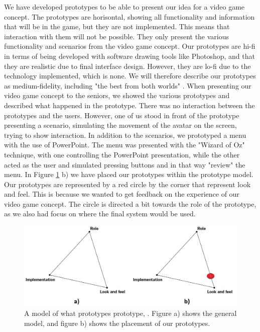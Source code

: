 We have developed prototypes to be able to present our idea for a video game concept. The prototypes are horisontal, showing all functionality and information that will be in the game, but they are not implemented. This means that interaction with them will not be possible. They only present the various functionality and scenarios from the video game concept. Our prototypes are hi-fi in terms of being developed with software drawing tools like Photoshop, and that they are realistic due to final interface design. However, they are lo-fi due to the technology implemented, which is none. We will therefore describe our prototypes as medium-fidelity, including "the best from both worlds" \cite{mediumfidelity}. When presenting our video game concept to the seniors, we showed the various prototypes and described what happened in the prototype. There was no interaction between the prototypes and the users. However, one of us stood in front of the prototype presenting a scenario, simulating the movement of the avatar on the screen, trying to show interaction. In addition to the scenarios, we prototyped a menu with the use of PowerPoint. The menu was presented with the "Wizard of Oz" technique, with one controlling the PowerPoint presentation, while the other acted as the user and simulated pressing buttons and in that way "review" the menu. In Figure \ref{fig:prototype} b) we have placed our prototypes within the prototype model. Our prototypes are represented by a red circle by the corner that represent look and feel. This is because we wanted to get feedback on the experience of our video game concept. The circle is directed a bit towards the role of the prototype, as we also had focus on where the final system would be used. 

\begin{figure} [H]
\centering
\includegraphics[scale=0.4]{prototypemodelDobbel.jpg}
\caption[Prototype model]{A model of what prototypes prototype, \cite{houde1997prototypes}. Figure a) shows the general model, and figure b) shows the placement of our prototypes.}
\label{fig:prototype}
\end{figure}

